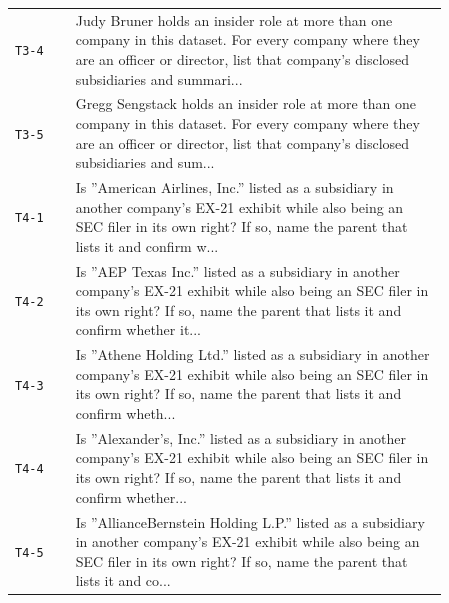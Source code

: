 \begin{tabular}{@{}lp{0.86\linewidth}@{}}
\texttt{T3-4} & Judy Bruner holds an insider role at more than one company in this dataset. For every company where they are an officer or director, list that company's disclosed subsidiaries and summari... \\
\texttt{T3-5} & Gregg Sengstack holds an insider role at more than one company in this dataset. For every company where they are an officer or director, list that company's disclosed subsidiaries and sum... \\
\texttt{T4-1} & Is ''American Airlines, Inc.'' listed as a subsidiary in another company's EX-21 exhibit while also being an SEC filer in its own right? If so, name the parent that lists it and confirm w... \\
\texttt{T4-2} & Is ''AEP Texas Inc.'' listed as a subsidiary in another company's EX-21 exhibit while also being an SEC filer in its own right? If so, name the parent that lists it and confirm whether it... \\
\texttt{T4-3} & Is ''Athene Holding Ltd.'' listed as a subsidiary in another company's EX-21 exhibit while also being an SEC filer in its own right? If so, name the parent that lists it and confirm wheth... \\
\texttt{T4-4} & Is ''Alexander's, Inc.'' listed as a subsidiary in another company's EX-21 exhibit while also being an SEC filer in its own right? If so, name the parent that lists it and confirm whether... \\
\texttt{T4-5} & Is ''AllianceBernstein Holding L.P.'' listed as a subsidiary in another company's EX-21 exhibit while also being an SEC filer in its own right? If so, name the parent that lists it and co... \\
\bottomrule
\end{tabular}
